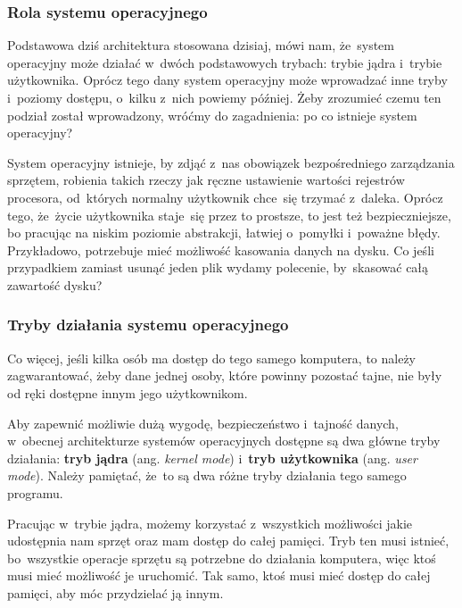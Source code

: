 \documentclass[10pt,t]{beamer}
\begin{document}
\begin{frame}
  \frametitle{Rola systemu operacyjnego}


  Podstawowa dziś architektura stosowana dzisiaj, mówi nam, że~system
  operacyjny może działać w~dwóch podstawowych trybach: trybie jądra
  i~trybie użytkownika. Oprócz tego dany system operacyjny może wprowadzać
  inne tryby i~poziomy dostępu, o~kilku z~nich powiemy później. Żeby
  zrozumieć czemu ten podział został wprowadzony, wróćmy do zagadnienia:
  po co istnieje system operacyjny?

  System operacyjny istnieje, by zdjąć z~nas obowiązek bezpośredniego
  zarządzania sprzętem, robienia takich rzeczy jak ręczne ustawienie
  wartości rejestrów procesora, od~których normalny użytkownik chce~się
  trzymać z~daleka. Oprócz tego, że~życie użytkownika staje~się przez to
  prostsze,
  to jest też bezpieczniejsze, bo pracując na niskim poziomie abstrakcji,
  łatwiej o~pomyłki i~poważne błędy. Przykładowo, potrzebuje mieć możliwość
  kasowania danych na dysku. Co jeśli przypadkiem zamiast usunąć jeden
  plik wydamy polecenie, by~skasować całą zawartość dysku?

\end{frame}





\begin{frame}
  \frametitle{Tryby działania systemu operacyjnego}


  Co więcej, jeśli kilka osób ma dostęp do tego samego komputera, to
  należy zagwarantować, żeby dane jednej osoby, które powinny pozostać
  tajne, nie były od ręki dostępne innym jego użytkownikom.

  Aby zapewnić możliwie dużą wygodę, bezpieczeństwo i~tajność danych,
  w~obecnej architekturze systemów operacyjnych dostępne są dwa główne tryby
  działania: \textbf{tryb jądra} (ang. \textit{kernel mode})
  i~\textbf{tryb użytkownika} (ang. \textit{user mode}). Należy pamiętać,
  że~to są dwa różne tryby działania tego samego programu.

  Pracując w~trybie jądra, możemy korzystać z~wszystkich możliwości jakie
  udostępnia nam sprzęt oraz mam dostęp do całej pamięci. Tryb ten musi
  istnieć, bo~wszystkie operacje sprzętu są potrzebne do działania
  komputera, więc
  ktoś musi mieć możliwość je uruchomić. Tak samo, ktoś musi mieć dostęp do
  całej pamięci, aby móc przydzielać ją innym.

\end{frame}
\end{document}
